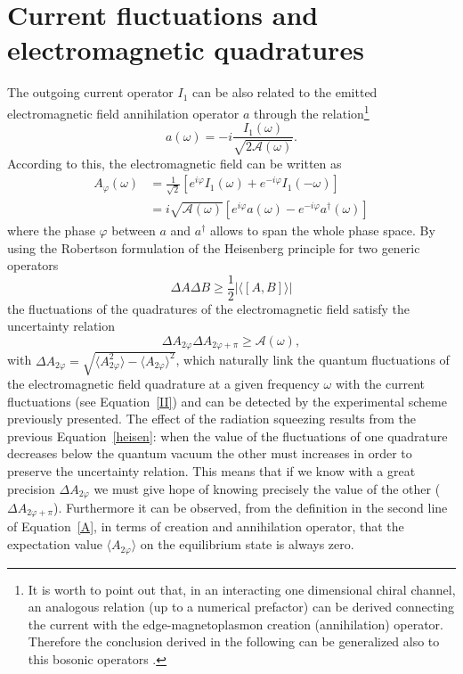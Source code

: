 \documentclass[12pt]{iopart}
\begin{document}
\section{Current fluctuations and electromagnetic quadratures}\label{Quadratures} 
The outgoing current operator $I_1$ can be also related to the emitted electromagnetic field annihilation operator $a$ through the relation\footnote{It is worth to point out that, in an interacting one dimensional chiral channel, an analogous relation (up to a numerical prefactor) can be derived connecting the current with the edge-magnetoplasmon creation (annihilation) operator. Therefore the conclusion derived in the following can be generalized also to this bosonic operators \cite{Feve_private}.} \cite{Grimsmo16}
\begin{equation}
a(\omega)= -i \frac{I_1(\omega)}{\sqrt{2 \mathcal{A}(\omega)}}.
\end{equation}
According to this, the electromagnetic field can be written as \cite{Gasse13, Mendes15}
\begin{align}
A_{\varphi}(\omega)&=\frac{1}{\sqrt{2}}\left[e^{i\varphi}I_1(\omega) +e^{-i \varphi} I_1(-\omega)\right]\nonumber \\
&=i \sqrt{\mathcal{A}(\omega)} \left[e^{i\varphi}a(\omega)-e^{-i \varphi}a^{\dagger}(\omega) \right]
\label{A}
\end{align}
where the phase $\varphi$ between $a$ and $a^{\dagger}$ allows to span the whole phase space. By using the Robertson formulation of the Heisenberg principle for two generic operators
\begin{equation}
    \Delta A \Delta B \geq \frac{1}{2}|\langle [A,B] \rangle|
\end{equation}
the fluctuations of the quadratures of the electromagnetic field satisfy the uncertainty relation 
\begin{equation}
\Delta A_{2\varphi} \Delta A_{2\varphi+\pi} \geq \mathcal{A}(\omega),
\label{heisen}
\end{equation}
with $\Delta A_{2\varphi}=\sqrt{\langle A_{2\varphi}^{2}\rangle-\langle A_{2\varphi} \rangle^{2}}$, which naturally link the quantum fluctuations of the electromagnetic field quadrature at a given frequency $\omega$ with the current fluctuations (see Equation~\eqref{II}) and can be detected by the experimental scheme previously presented. The effect of the radiation squeezing results from the previous Equation~\eqref{heisen}: when the value of the fluctuations of one quadrature decreases below the quantum vacuum the other must increases in order to preserve the uncertainty relation. This means that if we know with a great precision $\Delta A_{2\varphi}$ we must give hope of knowing precisely the value of the other ($\Delta A_{2\varphi+\pi}$). Furthermore it can be observed, from the definition in the second line of Equation~\eqref{A}, in terms of creation and annihilation operator, that the expectation value $\langle A_{2\varphi}\rangle$ on the equilibrium state is always zero.\\
\end{document}
